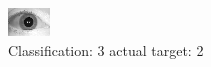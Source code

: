 \begin{figure}[h!]
\begin{center}
\includegraphics[width=0.60\columnwidth]{figures/ID1672_class_3_target_2.png}
\end{center}
\caption{ Classification: 3 actual target: 2}
\label{fig:ID1672_class_3_target_2}
\end{figure}

